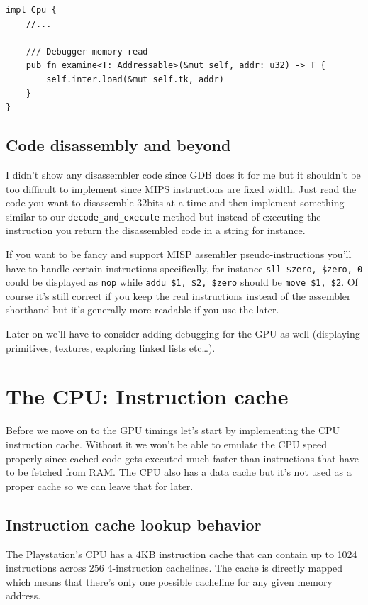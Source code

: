 \documentclass[a4paper]{article}
\newcommand{\code}[1] {\texttt{#1}}
\begin{document}
\begin{lstlisting}
impl Cpu {
    //...

    /// Debugger memory read
    pub fn examine<T: Addressable>(&mut self, addr: u32) -> T {
        self.inter.load(&mut self.tk, addr)
    }
}
\end{lstlisting}

\subsection{Code disassembly and beyond}

I didn't show any disassembler code since GDB does it for me but it
shouldn't be too difficult to implement since MIPS instructions are
fixed width. Just read the code you want to disassemble 32bits at a
time and then implement something similar to our
\code{decode\_and\_execute} method but instead of executing the
instruction you return the disassembled code in a string for instance.

If you want to be fancy and support MISP assembler pseudo-instructions
you'll have to handle certain instructions specifically, for instance
\mbox{\code{sll \$zero, \$zero, 0}} could be displayed as \code{nop}
while \mbox{\code{addu \$1, \$2, \$zero}} should be \mbox{\code{move
    \$1, \$2}}. Of course it's still correct if you keep the real
instructions instead of the assembler shorthand but it's generally
more readable if you use the later.

Later on we'll have to consider adding debugging for the GPU as well
(displaying primitives, textures, exploring linked lists etc\dots{}).

\section{The CPU: Instruction cache}

Before we move on to the GPU timings let's start by implementing the
CPU instruction cache. Without it we won't be able to emulate the CPU
speed properly since cached code gets executed much faster than
instructions that have to be fetched from RAM. The CPU also has a data
cache but it's not used as a proper cache so we can leave that for
later.

\subsection{Instruction cache lookup behavior}

The Playstation's CPU has a 4KB instruction cache that can contain up
to 1024 instructions across 256 4-instruction cachelines. The cache is
directly mapped which means that there's only one possible cacheline
for any given memory address.
\end{document}
